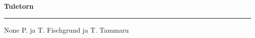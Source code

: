 \documentclass[10pt]{book}
\begin{document}
{
  \samepage
  \raggedbottom
  \raggedright
  \sloppy


  \vspace{0.2in}

  \noindent\begin{minipage}{.1\textwidth}
    \hfill\vspace{0.1in}
  \end{minipage}%
  \noindent\begin{minipage}{.8\textwidth}
    \centering
    \bfseries
    \large Tuletorn
  \end{minipage}%
  \noindent\begin{minipage}{.1\textwidth}
      \hfill\vspace{0.1in}
  \end{minipage}

  \nopagebreak[4]
  \vspace{0.1in}
  \nopagebreak[4]
  \hrule height 0.05ex
  \nopagebreak[4]
  \vspace{-0.05in}

  {\footnotesize None \hfill P. ja T. Fischgrund ja T. Tammaru }\\
  \vspace{0.01in}



}
\end{document}
